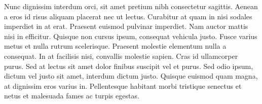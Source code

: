 Nunc dignissim interdum orci, sit amet pretium nibh consectetur
sagittis. Aenean a eros id risus aliquam placerat nec ut
lectus. Curabitur at quam in nisi sodales imperdiet in at
erat. Praesent euismod pulvinar imperdiet. Nam auctor mattis nisi in
efficitur. Quisque non cursus ipsum, consequat vehicula justo. Fusce
varius metus et nulla rutrum scelerisque. Praesent molestie elementum
nulla a consequat. In at facilisis nisi, convallis molestie
sapien. Cras id ullamcorper purus. Sed at lectus sit amet dolor
finibus suscipit vel et purus. Sed odio ipsum, dictum vel justo sit
amet, interdum dictum justo. Quisque euismod quam magna, at dignissim
eros varius in. Pellentesque habitant morbi tristique senectus et
netus et malesuada fames ac turpis egestas.

